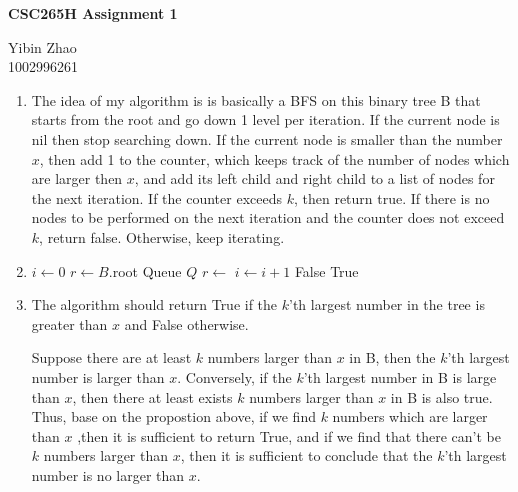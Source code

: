 \documentclass[10pt]{article}
\begin{document}
\begin{center}
{\bf \Large \bf CSC265H Assignment 1}\\
\end{center}

\noindent
Yibin Zhao\\
1002996261\\


\begin{enumerate}

\item
	The idea of my algorithm is is basically a BFS on this binary tree B that starts from the root and go down 1 level per iteration. If the current node is nil then stop searching down. If the current node is smaller than the number $x$, then add 1 to the counter, which keeps track of the number of nodes which are larger then $x$, and add its left child and right child to a list of nodes for the next iteration. If the counter exceeds $k$, then return true. If there is no nodes to be performed on the next iteration and the counter does not exceed $k$, return false. Otherwise, keep iterating.

\item 
\begin{algorithmic}[1]
		\State $i \gets 0$
		\State $r \gets B$.root
		\State Queue $Q$ 
		\State {} 
		 
			\State $r \gets$ 
				\State {}
				\State {}
				\State $i \gets i+1$
			\EndIf
		\EndWhile
			\State \Return False
		\Else
			\State \Return True
		\EndIf
	\EndFunction
\end{algorithmic}


\item %
	The algorithm should return True if the $k$'th largest number in the tree is greater than $x$ and False otherwise. 
   
 Suppose there are at least $k$ numbers larger than $x$ in B, then the $k$'th largest number is larger than $x$.
Conversely, if the $k$'th largest number in B is large than $x$, then there at least exists $k$ numbers larger than $x$ in B is also true. 
Thus, base on the propostion above, if we find $k$ numbers which are larger than $x$ ,then it is sufficient to return True, and if we find that there can't be $k$ numbers larger than $x$, then it is sufficient to conclude that the $k$'th largest number is no larger than $x$.




\end{enumerate}
\end{document}

